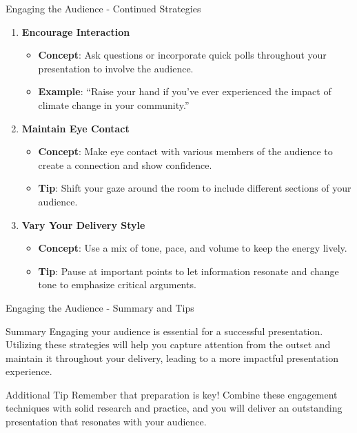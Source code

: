 \documentclass[aspectratio=169]{beamer}
\begin{document}
\begin{frame}[fragile]{Engaging the Audience - Continued Strategies}
    \begin{enumerate}[resume]
        \item \textbf{Encourage Interaction}
            \begin{itemize}
                \item \textbf{Concept}: Ask questions or incorporate quick polls throughout your presentation to involve the audience.
                \item \textbf{Example}: “Raise your hand if you’ve ever experienced the impact of climate change in your community.”
            \end{itemize}

        \item \textbf{Maintain Eye Contact}
            \begin{itemize}
                \item \textbf{Concept}: Make eye contact with various members of the audience to create a connection and show confidence.
                \item \textbf{Tip}: Shift your gaze around the room to include different sections of your audience.
            \end{itemize}

        \item \textbf{Vary Your Delivery Style}
            \begin{itemize}
                \item \textbf{Concept}: Use a mix of tone, pace, and volume to keep the energy lively.
                \item \textbf{Tip}: Pause at important points to let information resonate and change tone to emphasize critical arguments.
            \end{itemize}
    \end{enumerate}
\end{frame}

\begin{frame}[fragile]{Engaging the Audience - Summary and Tips}
    \begin{block}{Summary}
    Engaging your audience is essential for a successful presentation. Utilizing these strategies will help you capture attention from the outset and maintain it throughout your delivery, leading to a more impactful presentation experience.
    \end{block}

    \begin{block}{Additional Tip}
    Remember that preparation is key! Combine these engagement techniques with solid research and practice, and you will deliver an outstanding presentation that resonates with your audience.
    \end{block}
\end{frame}
\end{document}
